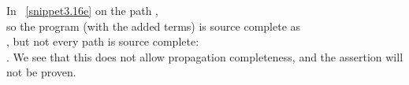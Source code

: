 In  ~\ref{snippet3.16e} on the path , \\
so the program (with the added terms) is source complete as\\
, but not every path is source complete:\\
. 
We see that this does not allow propagation completeness, and the assertion will not be proven.



